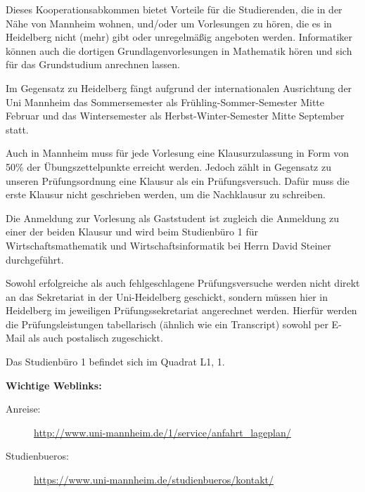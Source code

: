 Dieses Kooperationsabkommen bietet Vorteile für die Studierenden, die in der Nähe von Mannheim wohnen,
und/oder um Vorlesungen zu hören, die es in Heidelberg nicht (mehr) gibt oder unregelmäßig angeboten werden.
Informatiker können auch die dortigen Grundlagenvorlesungen in Mathematik hören und sich für das Grundstudium
anrechnen lassen.

Im Gegensatz zu Heidelberg fängt aufgrund der internationalen Ausrichtung der Uni Mannheim das Sommersemester als Frühling-Sommer-Semester
Mitte Februar und das Wintersemester als Herbst-Winter-Semester Mitte September statt.

Auch in Mannheim muss für jede Vorlesung eine Klausurzulassung in Form von 50\% der Übungszettelpunkte
erreicht werden. Jedoch zählt in Gegensatz zu unseren Prüfungsordnung eine Klausur als ein Prüfungsversuch. Dafür muss die erste Klausur nicht geschrieben werden, um die Nachklausur zu schreiben. 

Die Anmeldung zur Vorlesung als Gaststudent ist zugleich die Anmeldung zu einer der beiden Klausur und wird
beim Studienbüro 1 für Wirtschaftsmathematik und Wirtschaftsinformatik bei Herrn David Steiner
durchgeführt. 

Sowohl erfolgreiche als auch fehlgeschlagene Prüfungsversuche werden nicht direkt an das Sekretariat in
der Uni-Heidelberg geschickt, sondern müssen hier in Heidelberg im jeweiligen Prüfungssekretariat angerechnet
werden. Hierfür werden die Prüfungsleistungen tabellarisch (ähnlich wie ein Transcript) sowohl per E-Mail als auch postalisch zugeschickt.

Das Studienbüro 1 befindet sich im Quadrat L1, 1. 

\textbf{Wichtige Weblinks:}
\begin{description}
\item[Anreise:] \url{http://www.uni-mannheim.de/1/service/anfahrt_lageplan/}
\item[Studienbueros:] \url{https://www.uni-mannheim.de/studienbueros/kontakt/}
\end{description}
